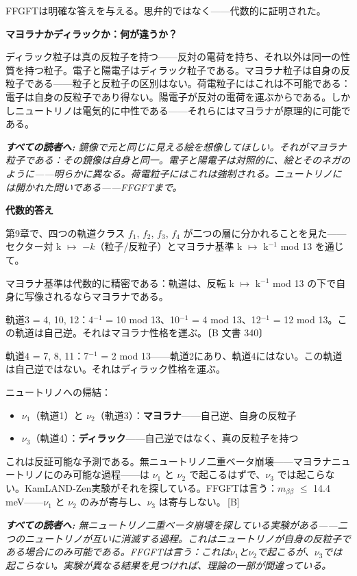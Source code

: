 \documentclass[11pt,openany]{book}
\newcommand{\status}[1]{\penalty10000\,{\tiny\textcolor{gray!70}{[#1]}}}
\newenvironment{laierspur}{%
  \par\vspace{4pt}%
  \noindent\small\itshape\color{blue!60!black}%
  \textbf{すべての読者へ:}\enspace\ignorespaces}{%
  \par\vspace{4pt}\normalsize\normalfont\normalcolor}
\begin{document}
FFGFTは明確な答えを与える。思弁的ではなく——代数的に証明された。

\textbf{マヨラナかディラックか：何が違うか？}

ディラック粒子は真の反粒子を持つ——反対の電荷を持ち、それ以外は同一の性質を持つ粒子。電子と陽電子はディラック粒子である。マヨラナ粒子は自身の反粒子である——粒子と反粒子の区別はない。荷電粒子にはこれは不可能である：電子は自身の反粒子であり得ない。陽電子が反対の電荷を運ぶからである。しかしニュートリノは電気的に中性である——それらにはマヨラナが原理的に可能である。

\begin{laierspur}
鏡像で元と同じに見える絵を想像してほしい。それがマヨラナ粒子である：その鏡像は自身と同一。電子と陽電子は対照的に、絵とそのネガのように——明らかに異なる。荷電粒子にはこれは強制される。ニュートリノには開かれた問いである——FFGFTまで。
\end{laierspur}

\textbf{代数的答え}

第9章で、四つの軌道クラス {$f_1$, $f_2$, $f_3$, $f_4$} が二つの層に分かれることを見た——セクター対 k $\mapsto$ $-k$（粒子/反粒子）とマヨラナ基準 k $\mapsto$ k$^{-1}$ mod 13 を通じて。

マヨラナ基準は代数的に精密である：軌道は、反転 k $\mapsto$ k$^{-1}$ mod 13 の下で自身に写像されるならマヨラナである。

軌道3 = {4, 10, 12}：4$^{-1}$ = 10 mod 13、10$^{-1}$ = 4 mod 13、12$^{-1}$ = 12 mod 13。この軌道は自己逆。それはマヨラナ性格を運ぶ。〔B 文書 340〕

軌道4 = {7, 8, 11}：7$^{-1}$ = 2 mod 13——軌道2にあり、軌道4にはない。この軌道は自己逆ではない。それはディラック性格を運ぶ。

ニュートリノへの帰結：
\begin{itemize}
\item $\nu_1$（軌道1）と $\nu_2$（軌道3）：\textbf{マヨラナ}——自己逆、自身の反粒子
\item $\nu_3$（軌道4）：\textbf{ディラック}——自己逆ではなく、真の反粒子を持つ
\end{itemize}

これは反証可能な予測である。無ニュートリノ二重ベータ崩壊——マヨラナニュートリノにのみ可能な過程——は $\nu_1$ と $\nu_2$ で起こるはずで、$\nu_3$ では起こらない。KamLAND-Zen実験がそれを探している。FFGFTは言う：$m_{\beta\beta}$ $\leq$ 14.4 meV——$\nu_1$ と $\nu_2$ のみが寄与し、$\nu_3$ は寄与しない。\status{B}

\begin{laierspur}
無ニュートリノ二重ベータ崩壊を探している実験がある——二つのニュートリノが互いに消滅する過程。これはニュートリノが自身の反粒子である場合にのみ可能である。FFGFTは言う：これは$\nu_1$と$\nu_2$で起こるが、$\nu_3$では起こらない。実験が異なる結果を見つければ、理論の一部が間違っている。
\end{laierspur}
\end{document}
